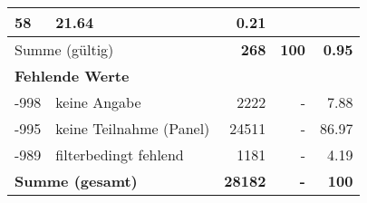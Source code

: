 \begin{longtable}{lXrrr}
       \num{58} &
       \num[round-mode=places,round-precision=2]{21.64} &
         \num[round-mode=places,round-precision=2]{0.21} \\
     \midrule
     \multicolumn{2}{l}{Summe (gültig)} &
       \textbf{\num{268}} &
     \textbf{\num{100}} &
       \textbf{\num[round-mode=places,round-precision=2]{0.95}} \\
     \multicolumn{5}{l}{\textbf{Fehlende Werte}}\\
       -998 &
       keine Angabe &
         \num{2222} &
        - &
         \num[round-mode=places,round-precision=2]{7.88} \\
       -995 &
       keine Teilnahme (Panel) &
         \num{24511} &
        - &
         \num[round-mode=places,round-precision=2]{86.97} \\
       -989 &
       filterbedingt fehlend &
         \num{1181} &
        - &
         \num[round-mode=places,round-precision=2]{4.19} \\
     \midrule
     \multicolumn{2}{l}{\textbf{Summe (gesamt)}} &
          \textbf{\num{28182}} &
        \textbf{-} &
        \textbf{\num{100}} \\
     \bottomrule
     \end{longtable}
     
